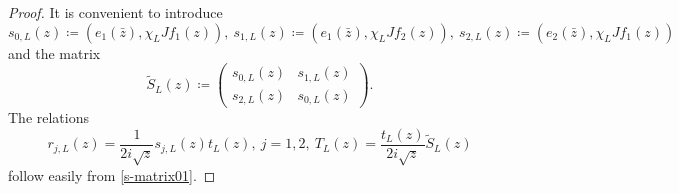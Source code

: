 \begin{proof}
It is convenient to introduce
\begin{equation*}
  s_{0,L}(z) \coloneqq (e_1(\bar z),\chi_L Jf_1(z)),\ 
  s_{1,L}(z) \coloneqq (e_1(\bar z),\chi_L Jf_2(z)),\ s_{2,L}(z) \coloneqq (e_2(\bar z),\chi_LJf_1(z))
\end{equation*}
and the matrix
\begin{equation*}
  \tilde S_L(z) \coloneqq
\begin{pmatrix}
  s_{0,L}(z) & s_{1,L}(z) \\
  s_{2,L}(z) & s_{0,L}(z)
\end{pmatrix} .
\end{equation*}
The relations
\begin{equation}\label{wo02t04}
  r_{j,L}(z) = \frac{1}{2i\sqrt{z}} s_{j,L}(z) t_L(z),\ j=1,2,\
  T_L(z) =  \frac{t_L(z)}{2i\sqrt{z}}\tilde S_L(z)
\end{equation}
follow easily from \eqref{s-matrix01}.


\end{proof}
